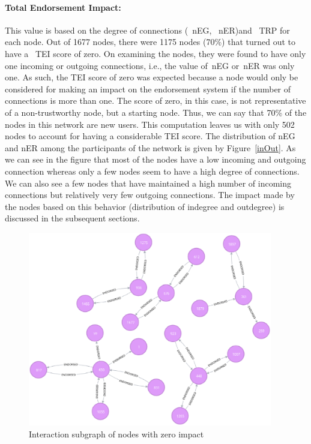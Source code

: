 \paragraph{Total Endorsement Impact:} \label{par:TEI}This value is based on the
degree of connections (~\ac{nEG}, ~\ac{nER})and ~\ac{TRP} for each node. Out of
1677 nodes, there were 1175 nodes (70\%) that turned out to have a ~\ac{TEI}
score of zero. On examining the nodes, they were found to have only one
incoming or outgoing connections, i.e., the value of~\ac{nEG} or~\ac{nER} was
only one. As such, the \ac{TEI} score of zero was expected because a node would
only be considered for making an impact on the endorsement system if the number
of connections is more than one. The score of zero, in this case, is not
representative of a non-trustworthy node, but a starting node. Thus, we can say
that 70\% of the nodes in this network are new users. This computation leaves
us with only 502 nodes to account for having a considerable \ac{TEI} score. The
distribution of \ac{nEG} and \ac{nER} among the participants of the network is
given by Figure~\ref{inOut}. As we can see in the figure that most of the nodes
have a low incoming and outgoing connection whereas only a few nodes seem to
have a high degree of connections. We can also see a few nodes that have
maintained a high number of incoming connections but relatively very few
outgoing connections. The impact made by the nodes based on this behavior
(distribution of indegree and outdegree) is discussed in the subsequent
sections.
\begin{figure}[H]
	\includegraphics[width=0.95\textwidth]{Images/nodesWithImpactZero.eps}
	\caption{Interaction subgraph of nodes with zero impact}
	\label{fig:zeroimpact}
\end{figure}
